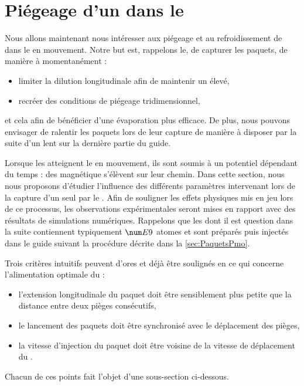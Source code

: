 \casse


\section{Piégeage d'un \pat dans le \tpIP}\label{sec:Piegeage1pkt}
Nous allons maintenant nous intéresser aux piégeage et au refroidissement de \pats dans le \tpIP en mouvement. Notre but est, rappelons le, de capturer les paquets, de manière à momentanément :
\begin{itemize}
	\item limiter la dilution longitudinale afin de maintenir un \tcolel élevé,
	\item recréer des conditions de piégeage tridimensionnel, 
\end{itemize} 
et cela afin de bénéficier d'une évaporation plus efficace. De plus, nous pouvons envisager de ralentir les paquets lors de leur capture de manière à disposer par la suite d'un \jat lent sur la dernière partie du guide.

Lorsque les \pats atteignent le \tpIP en mouvement, ils sont soumis à un potentiel dépendant du temps : des \bapots magnétique s'élèvent sur leur chemin.
Dans cette section, nous nous proposons d'étudier l'influence des différents paramètres intervenant lors de la capture d'un seul \pat par le \tpIP. Afin de souligner les effets physiques mis en jeu lors de ce processus, les observations expérimentales seront mises en rapport avec des résultats de simulations numériques.
Rappelons que les \pats dont il est question dans la suite contiennent typiquement $\val{E9}$ atomes et sont préparés puis injectés dans le guide suivant la procédure décrite dans la \autoref{sec:PaquetsPmo}. 

Trois critères intuitifs peuvent d'ores et déjà être soulignés en ce qui concerne l'alimentation optimale du \tp : 
\begin{itemize}
	\item l'extension longitudinale du paquet doit être sensiblement plus petite que la distance entre deux pièges consécutifs,
	\item le lancement des paquets doit être synchronisé avec le déplacement des pièges, 
	\item la vitesse d'injection du paquet doit être voisine de la vitesse de déplacement du \tpIP.
\end{itemize}
Chacun de ces points fait l'objet d'une sous-section ci-dessous.


